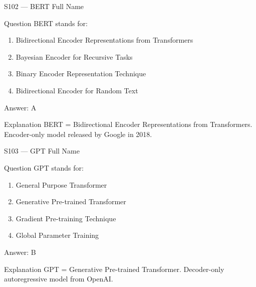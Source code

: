 \documentclass[aspectratio=169,8pt]{beamer}
\begin{document}
	\begin{frame}{S102 --- BERT Full Name}
		\begin{block}{Question}
			BERT stands for:
			\begin{enumerate}
				\item Bidirectional Encoder Representations from Transformers
				\item Bayesian Encoder for Recursive Tasks
				\item Binary Encoder Representation Technique
				\item Bidirectional Encoder for Random Text
			\end{enumerate}
		\end{block}
		\begin{exampleblock}{Answer: A}\end{exampleblock}
		\begin{block}{Explanation}
			BERT = Bidirectional Encoder Representations from Transformers. Encoder-only model released by Google in 2018.
		\end{block}
	\end{frame}
	
	\begin{frame}{S103 --- GPT Full Name}
		\begin{block}{Question}
			GPT stands for:
			\begin{enumerate}
				\item General Purpose Transformer
				\item Generative Pre-trained Transformer
				\item Gradient Pre-training Technique
				\item Global Parameter Training
			\end{enumerate}
		\end{block}
		\begin{exampleblock}{Answer: B}\end{exampleblock}
		\begin{block}{Explanation}
			GPT = Generative Pre-trained Transformer. Decoder-only autoregressive model from OpenAI.
		\end{block}
	\end{frame}
	
\end{document}
